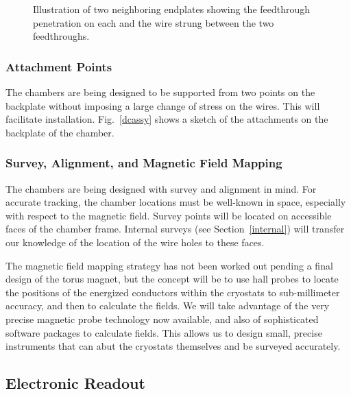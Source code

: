 \begin{figure}[htbp]
\vspace{5.5cm}
\caption{\small{Illustration of two neighboring endplates showing the 
feedthrough penetration on each and the wire strung between the two 
feedthroughs.}}
\label{feedthrough}
\end{figure}

\subsubsection{Attachment Points}

The chambers are being designed to be supported from two points on the 
backplate without imposing a large change of stress on the wires.  This will 
facilitate installation.  Fig.~\ref{dcassy} shows a sketch of the attachments 
on the backplate of the chamber.

\subsubsection{Survey, Alignment, and Magnetic Field Mapping}

The chambers are being designed with survey and alignment in mind.  For 
accurate tracking, the chamber locations must be well-known in space, 
especially with respect to the magnetic field.  Survey points will be 
located on accessible faces of the chamber frame.  Internal surveys 
(see Section~\ref{internal}) will transfer our knowledge of the location 
of the wire holes to these faces.

The magnetic field mapping strategy has not been worked out pending a final 
design of the torus magnet, but the concept will be to use hall probes to 
locate the positions of the energized conductors within the cryostats to 
sub-millimeter accuracy, and then to calculate the fields.  We will take 
advantage of the very precise magnetic probe technology now available, and 
also of sophisticated software packages to calculate fields.  This allows us 
to design small, precise instruments that can abut the cryostats themselves 
and be surveyed accurately.

\subsection{Electronic Readout}

